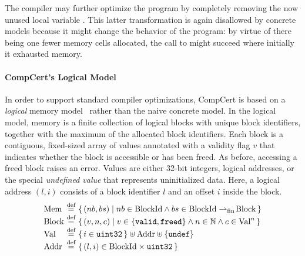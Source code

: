 %

The compiler may further optimize the program by completely removing
the now unused local variable . This latter transformation is again
disallowed by concrete models because it might change the behavior of
the program:
by virtue of there being one fewer memory cells allocated, the call to 
might succeed where initially it exhausted memory.



\paragraph{CompCert's Logical Model}

In order to support standard compiler optimizations, CompCert is based on a \emph{logical} memory
model~\cite{leroy:compcert,Leroy-Appel-Blazy-Stewart-memory-v2} rather than the naive concrete
model.  In the logical model, memory is a finite collection of logical blocks with unique block
identifiers, together with the maximum of the allocated block identifiers.  Each block is a
contiguous, fixed-sized array of values annotated with a validity flag $v$ that indicates whether
the block is accessible or has been freed. As before, accessing a freed block raises an error.
Values are either 32-bit integers, logical addresses, or the special \emph{undefined value} that
represents uninitialized data.  Here, a logical address $(l,i)$ consists of a block identifier $l$
and an offset $i$ inside the block.
\[
\begin{array}{@{}l@{~}c@{~}l@{}}
\rtlMem &\defeq& \setof{(nb,bs)\suchthat nb\in\rtlBId\land bs \in \rtlBId \fpfun \rtlBlock} \\
\rtlBlock &\defeq&
\setof{(v, n, c) \suchthat
  v \in \setofz{\rtlvalid,\rtlfreed} \land n \in \Nat \land c \in \rtlVal^n } \\
\rtlVal &\defeq& \setof{i\in\usize} \uplus \rtlAddr \uplus \setofz{\rtlundef} \\
\rtlAddr &\defeq& \setof{(l,i) \in \rtlBId\times \usize}
\end{array}
\]

